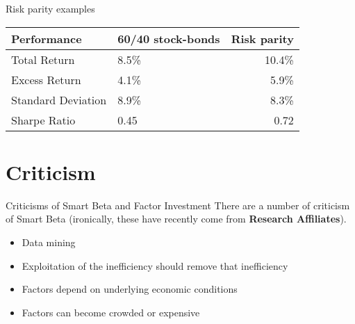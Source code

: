 \documentclass[14pt,xcolor=pdftex,dvipsnames,table]{beamer}\usepackage[]{graphicx}\usepackage[]{color}
\begin{document}
\begin{frame}{Risk parity examples}
\begin{table}
\begin{center}
\begin{tabular}{l  p{2cm} r}
\textbf{Performance} & \textbf{60/40 stock-bonds} & \textbf{Risk parity}\\
\hline
Total Return & 8.5\% & 10.4\% \\
Excess Return & 4.1\% & 5.9\%\\
Standard Deviation & 8.9\% & 8.3\% \\
Sharpe Ratio & 0.45 & 0.72
\end{tabular}
\end{center}
\end{table}
\end{frame}


%
\section{Criticism}
\begin{frame}{Criticisms of Smart Beta and Factor Investment}
There are a number of criticism of Smart Beta (ironically, these have recently 
come from \textbf{Research Affiliates}). 
\begin{itemize}[<+-| alert@+>]
\pause
\item Data mining
\item Exploitation of the inefficiency should remove that inefficiency
\item Factors depend on underlying economic conditions
\item Factors can become crowded or expensive 
\end{itemize}
\end{frame}
\end{document}

